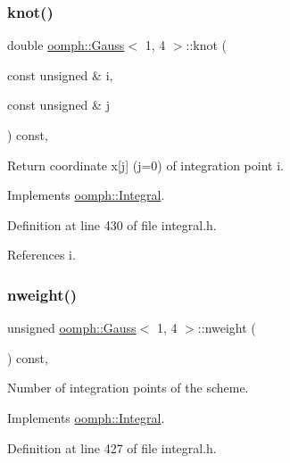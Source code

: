 \subsubsection{\texorpdfstring{knot()}{knot()}}
{\footnotesize\ttfamily double \hyperlink{classoomph_1_1Gauss}{oomph\+::\+Gauss}$<$ 1, 4 $>$\+::knot (\begin{DoxyParamCaption}\item[{const unsigned \&}]{i,  }\item[{const unsigned \&}]{j }\end{DoxyParamCaption}) const\hspace{0.3cm}{\ttfamily [inline]}, {\ttfamily [virtual]}}



Return coordinate x\mbox{[}j\mbox{]} (j=0) of integration point i. 



Implements \hyperlink{classoomph_1_1Integral_a1a2122f99a87c18649bafdd9ed739758}{oomph\+::\+Integral}.



Definition at line 430 of file integral.\+h.



References i.

\mbox{\label{classoomph_1_1Gauss_3_011_00_014_01_4_a25cfa5afbd5ac60332263a72374aef8a}} 
\subsubsection{\texorpdfstring{nweight()}{nweight()}}
{\footnotesize\ttfamily unsigned \hyperlink{classoomph_1_1Gauss}{oomph\+::\+Gauss}$<$ 1, 4 $>$\+::nweight (\begin{DoxyParamCaption}{ }\end{DoxyParamCaption}) const\hspace{0.3cm}{\ttfamily [inline]}, {\ttfamily [virtual]}}



Number of integration points of the scheme. 



Implements \hyperlink{classoomph_1_1Integral_a1a270de9d99a1fcf1d25a6c1017f65fa}{oomph\+::\+Integral}.



Definition at line 427 of file integral.\+h.

